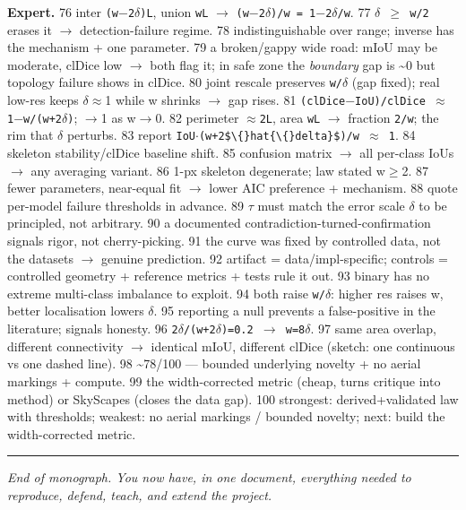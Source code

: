 \documentclass[11pt]{article}
\begin{document}
\textbf{Expert.} 76 inter \texttt{(w$-$2$\delta$)L}, union \texttt{wL} $\rightarrow$ \texttt{(w$-$2$\delta$)/w = 1$-$2$\delta$/w}. 77 \texttt{$\delta$ $\geq$ w/2} erases it $\rightarrow$ detection-failure regime. 78 indistinguishable over range; inverse has the mechanism + one parameter. 79 a broken/gappy wide road: mIoU may be moderate, clDice low $\rightarrow$ both flag it; in safe zone the \textit{boundary} gap is \textasciitilde{}0 but topology failure shows in clDice. 80 joint rescale preserves \texttt{w/$\delta$} (gap fixed); real low-res keeps $\delta$$\approx$1 while w shrinks $\rightarrow$ gap rises. 81 \texttt{(clDice$-$IoU)/clDice $\approx$ 1$-$w/(w+2$\delta$)}; $\rightarrow$1 as w$\rightarrow$0. 82 perimeter \texttt{$\approx$2L}, area \texttt{wL} $\rightarrow$ fraction \texttt{2/w}; the rim that $\delta$ perturbs. 83 report \texttt{IoU$\cdot$(w+2\$\textbackslash\{\}hat\{\textbackslash\{\}delta\}\$)/w $\approx$ 1}. 84 skeleton stability/clDice baseline shift. 85 confusion matrix $\rightarrow$ all per-class IoUs $\rightarrow$ any averaging variant. 86 1-px skeleton degenerate; law stated w$\geq$2. 87 fewer parameters, near-equal fit $\rightarrow$ lower AIC preference + mechanism. 88 quote per-model failure thresholds in advance. 89 \texttt{$\tau$} must match the error scale $\delta$ to be principled, not arbitrary. 90 a documented contradiction-turned-confirmation signals rigor, not cherry-picking. 91 the curve was fixed by controlled data, not the datasets $\rightarrow$ genuine prediction. 92 artifact = data/impl-specific; controls = controlled geometry + reference metrics + tests rule it out. 93 binary has no extreme multi-class imbalance to exploit. 94 both raise \texttt{w/$\delta$}: higher res raises w, better localisation lowers $\delta$. 95 reporting a null prevents a false-positive in the literature; signals honesty. 96 \texttt{2$\delta$/(w+2$\delta$)=0.2 $\rightarrow$ w=8$\delta$}. 97 same area overlap, different connectivity $\rightarrow$ identical mIoU, different clDice (sketch: one continuous vs one dashed line). 98 \textasciitilde{}78/100 --- bounded underlying novelty + no aerial markings + compute. 99 the width-corrected metric (cheap, turns critique into method) or SkyScapes (closes the data gap). 100 strongest: derived+validated law with thresholds; weakest: no aerial markings / bounded novelty; next: build the width-corrected metric.

\vspace{3pt}\hrule\vspace{3pt}

\textit{End of monograph. You now have, in one document, everything needed to reproduce, defend, teach, and extend the project.}
\end{document}
